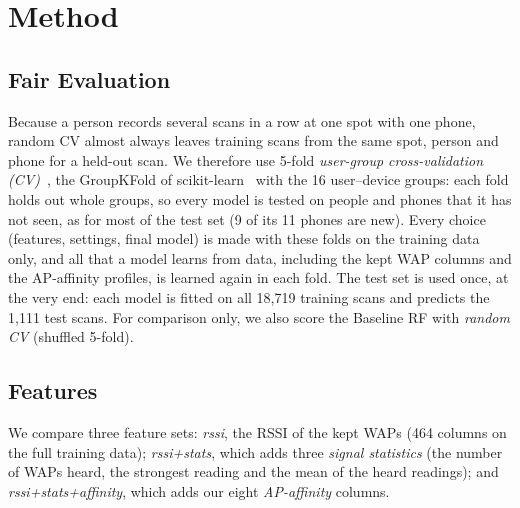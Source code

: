 \section{Method}\label{sec:method}

\subsection{Fair Evaluation}\label{sec:fair}
Because a person records several scans in a row at one spot with one phone,
random CV almost always leaves training scans from the same spot, person and
phone for a held-out scan. We therefore use 5-fold \emph{user-group
cross-validation (CV)}~\cite{roberts2017crossvalidation}, the GroupKFold of
scikit-learn~\cite{pedregosa2011scikit} with the 16 user--device groups: each
fold holds out whole groups, so every model is tested on people and phones
that it has not seen, as for most of the test set (9 of its 11 phones are
new). Every choice (features, settings,
final model) is made with these folds on the training data only, and all that
a model learns from data, including the kept WAP columns and the AP-affinity
profiles, is learned again in each fold. The test set is used once, at the
very end: each model is fitted on all 18,719 training scans and predicts the
1,111 test scans. For comparison only, we also score the Baseline RF with
\emph{random CV} (shuffled 5-fold).

\subsection{Features}\label{sec:features}
We compare three feature sets: \emph{rssi}, the RSSI of the kept WAPs (464
columns on the full training data); \emph{rssi+stats}, which adds three
\emph{signal statistics} (the number of WAPs heard, the strongest reading and
the mean of the heard readings); and \emph{rssi+stats+affinity}, which adds our
eight \emph{AP-affinity} columns.

